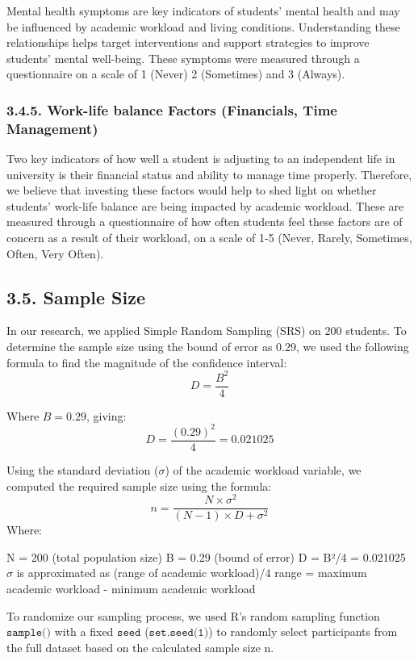 \documentclass[
  letterpaper,
  DIV=11,
  numbers=noendperiod]{scrartcl}
\begin{document}
Mental health symptoms are key indicators of students' mental health and
may be influenced by academic workload and living conditions.
Understanding these relationships helps target interventions and support
strategies to improve students' mental well-being. These symptoms were
measured through a questionnaire on a scale of 1 (Never) 2 (Sometimes)
and 3 (Always).

\subsubsection{3.4.5. Work-life balance Factors (Financials, Time
Management)}\label{work-life-balance-factors-financials-time-management}

Two key indicators of how well a student is adjusting to an independent
life in university is their financial status and ability to manage time
properly. Therefore, we believe that investing these factors would help
to shed light on whether students' work-life balance are being impacted
by academic workload. These are measured through a questionnaire of how
often students feel these factors are of concern as a result of their
workload, on a scale of 1-5 (Never, Rarely, Sometimes, Often, Very
Often).

\subsection{3.5. Sample Size}\label{sample-size}

In our research, we applied Simple Random Sampling (SRS) on 200
students. To determine the sample size using the bound of error as 0.29,
we used the following formula to find the magnitude of the confidence
interval: \[
D = \frac{B^2}{4}
\]

Where \(B = 0.29\), giving: \[
D = \frac{(0.29)^2}{4} = 0.021025
\]

Using the standard deviation (\(\sigma\)) of the academic workload
variable, we computed the required sample size using the formula: \[
n = \frac{N \times \sigma^2}{(N-1) \times D + \sigma^2}
\] Where:

N = 200 (total population size) B = 0.29 (bound of error) D = B²/4 =
0.021025 \(\sigma\) is approximated as (range of academic workload)/4
range = maximum academic workload - minimum academic workload

To randomize our sampling process, we used R's random sampling function
\(\texttt{sample()}\) with a fixed \(\texttt{seed}\)
(\(\texttt{set.seed(1)}\)) to randomly select participants from the full
dataset based on the calculated sample size n.
\end{document}
